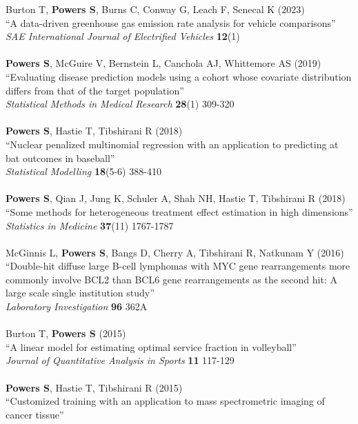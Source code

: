 \documentclass{article}
\begin{document}
Burton T, {\bf Powers S}, Burns C, Conway G, Leach F, Senecal K (2023)\\
``A data-driven greenhouse gas emission rate analysis for vehicle comparisons''\\
{\it SAE International Journal of Electrified Vehicles} {\bf 12}(1)\\
~\\
{\bf Powers S}, McGuire V, Bernstein L, Canchola AJ, Whittemore AS (2019)\\
``Evaluating disease prediction models using a cohort whose covariate distribution differs from that of the target population''\\
{\it Statistical Methods in Medical Research} {\bf 28}(1) 309-320\\
~\\
{\bf Powers S}, Hastie T, Tibshirani R (2018)\\
``Nuclear penalized multinomial regression with an application to predicting at bat outcomes in baseball''\\
{\it Statistical Modelling} {\bf 18}(5-6) 388-410\\
~\\
{\bf Powers S}, Qian J, Jung K, Schuler A, Shah NH, Hastie T, Tibshirani R (2018)\\
``Some methods for heterogeneous treatment effect estimation in high dimensions''\\
{\it Statistics in Medicine} {\bf 37}(11) 1767-1787\\
~\\
McGinnis L, {\bf Powers S}, Bangs D, Cherry A, Tibshirani R, Natkunam Y (2016)\\
``Double-hit diffuse large B-cell lymphomas with MYC gene rearrangements more commonly involve BCL2 than BCL6 gene rearrangements as the second hit: A large scale single institution study''\\
{\it Laboratory Investigation} {\bf 96} 362A\\
~\\
Burton T, {\bf Powers S} (2015)\\
``A linear model for estimating optimal service fraction in volleyball''\\
{\it Journal of Quantitative Analysis in Sports} {\bf 11} 117-129\\
~\\
{\bf Powers S}, Hastie T, Tibshirani R (2015)\\
``Customized training with an application to mass spectrometric imaging of cancer tissue''\\
\end{document}
